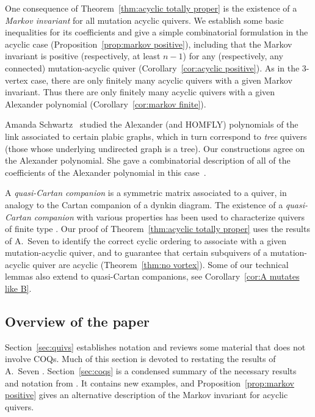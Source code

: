 \documentclass[11pt, letterpaper]{amsart}
\newcommand{\cS}[1]{{\noindent\textsf{\color{purple}$\blacksquare$~#1~$\blacksquare$}}}
\theoremstyle{definition}
\numberwithin{equation}{section}
\begin{document}
One consequence of Theorem~\ref{thm:acyclic totally proper} is the existence of a \emph{Markov invariant} for all mutation acyclic quivers. 
We establish some basic inequalities for its coefficients and give a simple combinatorial formulation in the acyclic case (Proposition~\ref{prop:markov positive}), including that the Markov invariant is positive (respectively, at least $n-1$) for any (respectively, any connected) mutation-acyclic quiver (Corollary~\ref{cor:acyclic positive}). 
As in the $3$-vertex case, there are only finitely many acyclic quivers with a given Markov invariant. 
Thus there are only finitely many acyclic quivers with a given Alexander polynomial (Corollary~\ref{cor:markov finite}). %

Amanda Schwartz~\cite{SchwartzTree} studied the Alexander (and HOMFLY) polynomials of the link associated to certain plabic graphs, which in turn correspond to \emph{tree} quivers (those whose underlying undirected graph is a tree).
Our constructions agree on the Alexander polynomial.
She gave a combinatorial description of all of the coefficients of the Alexander polynomial in this case~\cite[Theorem 4.2]{SchwartzTree}.

A \emph{quasi-Cartan companion} is a symmetric matrix associated to a quiver, in analogy to the Cartan companion of a dynkin diagram.
The existence of a \emph{quasi-Cartan companion} with various properties has been used to characterize quivers of finite type \cite{BGZsymmetrizable, SevenSemiPositive}. %
Our proof of Theorem~\ref{thm:acyclic totally proper} uses the results of A.~Seven \cite{SevenAMatrices} to identify the correct cyclic ordering to associate with a given mutation-acyclic quiver, and to guarantee that certain subquivers of a mutation-acyclic quiver are acyclic (Theorem~\ref{thm:no vortex}).
Some of our technical lemmas also extend to quasi-Cartan companions, see Corollary~\ref{cor:A mutates like B}.


\subsection*{Overview of the paper}
Section~\ref{sec:quivs} establishes notation and reviews some material that does not involve COQs.
Much of this section is devoted to restating the results of A.~Seven \cite{SevenAMatrices}. 
Section~\ref{sec:coqs} is a condensed summary of the necessary results and notation from \cite{COQ}. 
It contains new examples, and Proposition~\ref{prop:markov positive} gives an alternative description of the Markov invariant for acyclic quivers.
\end{document}

